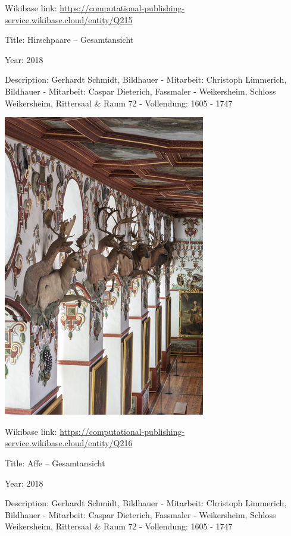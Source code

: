 \documentclass[
  letterpaper,
]{book}
\begin{document}
Wikibase link:
\url{https://computational-publishing-service.wikibase.cloud/entity/Q215}

Title: Hirschpaare -- Gesamtansicht

Year: 2018

Description: Gerhardt Schmidt, Bildhauer - Mitarbeit: Christoph
Limmerich, Bildhauer - Mitarbeit: Caspar Dieterich, Fassmaler -
Weikersheim, Schloss Weikersheim, Rittersaal \& Raum 72 - Vollendung:
1605 - 1747

\includegraphics{paintings_files/figure-pdf/cell-3-output-8.png}

Wikibase link:
\url{https://computational-publishing-service.wikibase.cloud/entity/Q216}

Title: Affe -- Gesamtansicht

Year: 2018

Description: Gerhardt Schmidt, Bildhauer - Mitarbeit: Christoph
Limmerich, Bildhauer - Mitarbeit: Caspar Dieterich, Fassmaler -
Weikersheim, Schloss Weikersheim, Rittersaal \& Raum 72 - Vollendung:
1605 - 1747
\end{document}
